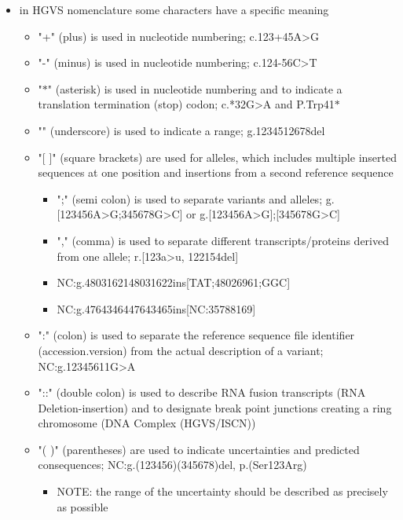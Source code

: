 \documentclass[12pt]{scrartcl}
\begin{document}
\begin{itemize}
\item in HGVS nomenclature some characters have a specific meaning

\begin{itemize}
\item "+" (plus) is used in nucleotide numbering; c.123+45A>G
\item "-" (minus) is used in nucleotide numbering; c.124-56C>T
\item "\(\ast\)" (asterisk) is used in nucleotide numbering and to indicate a
translation termination (stop) codon; c.*32G>A and P.Trp41\(\ast\)
\item "\textunderscore" (underscore) is used to indicate a range; g.12345\textunderscore12678del
\item "[ ]" (square brackets) are used for alleles, which includes
multiple inserted sequences at one position and insertions from a
second reference sequence
\begin{itemize}
\item ";" (semi colon) is used to separate variants and alleles;
g.[123456A>G;345678G>C] or g.[123456A>G];[345678G>C]
\item "," (comma) is used to separate different transcripts/proteins
derived from one allele; r.[123a>u, 122\textunderscore154del]
\item NC:g.48031621\textunderscore48031622ins[TAT;48026961;GGC]
\item NC:g.47643464\textunderscore47643465ins[NC:35788169]
\end{itemize}
\item ":" (colon) is used to separate the reference sequence file
identifier (accession.version\textunderscorenumber) from the
actual description of a variant;
NC:g.12345611G>A
\item "::" (double colon) is used to describe RNA fusion transcripts
(RNA Deletion-insertion) and to designate break point junctions
creating a ring chromosome (DNA Complex (HGVS/ISCN))
\item "( )" (parentheses) are used to indicate uncertainties and
predicted consequences;
NC:g.(123456)\textunderscore(345678)del, p.(Ser123Arg)
\begin{itemize}
\item NOTE: the range of the uncertainty should be described as precisely as possible

\end{itemize}
\end{itemize}
\end{itemize}
\end{document}

